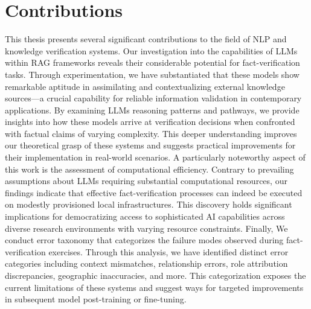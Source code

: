 \section{Contributions}\label{sec:contributions}
This thesis presents several significant contributions to the field of \ac{NLP} and knowledge verification systems.
Our investigation into the capabilities of \acp{LLM} within \ac{RAG} frameworks reveals their considerable potential for fact-verification tasks.
Through experimentation, we have substantiated that these models show remarkable aptitude in assimilating and contextualizing external knowledge sources—a crucial capability for reliable information validation in contemporary applications.
By examining \acp{LLM} reasoning patterns and pathways, we provide insights into how these models arrive at verification decisions when confronted with factual claims of varying complexity.
This deeper understanding improves our theoretical grasp of these systems and suggests practical improvements for their implementation in real-world scenarios.
A particularly noteworthy aspect of this work is the assessment of computational efficiency.
Contrary to prevailing assumptions about LLMs requiring substantial computational resources, our findings indicate that effective fact-verification processes can indeed be executed on modestly provisioned local infrastructures.
This discovery holds significant implications for democratizing access to sophisticated AI capabilities across diverse research environments with varying resource constraints.
Finally, We conduct error taxonomy that categorizes the failure modes observed during fact-verification exercises.
Through this analysis, we have identified distinct error categories including context mismatches, relationship errors, role attribution discrepancies, geographic inaccuracies, and more.
This categorization exposes the current limitations of these systems and suggest ways for targeted improvements in subsequent model post-training or fine-tuning.
%
